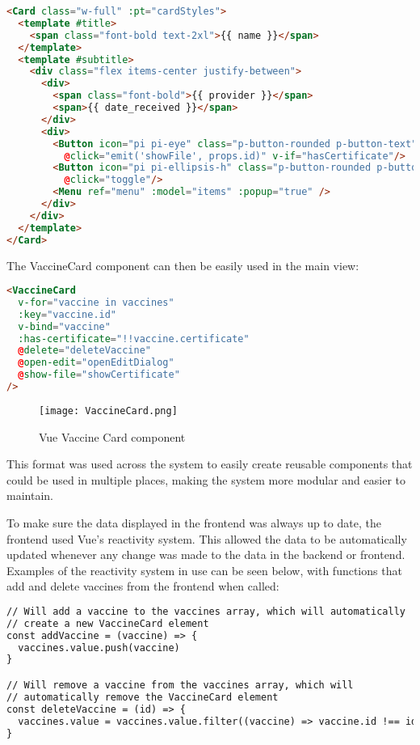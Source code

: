 \begin{lstlisting}[language=HTML, caption=Vue Vaccine Card Component Example]
<Card class="w-full" :pt="cardStyles">
  <template #title>
    <span class="font-bold text-2xl">{{ name }}</span>
  </template>
  <template #subtitle>
    <div class="flex items-center justify-between">
      <div>
        <span class="font-bold">{{ provider }}</span>
        <span>{{ date_received }}</span> 
      </div>
      <div>
        <Button icon="pi pi-eye" class="p-button-rounded p-button-text"
          @click="emit('showFile', props.id)" v-if="hasCertificate"/>
        <Button icon="pi pi-ellipsis-h" class="p-button-rounded p-button-text"
          @click="toggle"/>
        <Menu ref="menu" :model="items" :popup="true" />
      </div>
    </div>
  </template>
</Card>  
\end{lstlisting}

The VaccineCard component can then be easily used in the main view:

\begin{lstlisting}[language=HTML, caption=Using VaccineCard Component]
<VaccineCard
  v-for="vaccine in vaccines"
  :key="vaccine.id" 
  v-bind="vaccine"
  :has-certificate="!!vaccine.certificate"
  @delete="deleteVaccine"
  @open-edit="openEditDialog"
  @show-file="showCertificate"
/>
\end{lstlisting}

\begin{figure}[htbp]
  \centering
  \texttt{[image: VaccineCard.png]}
  \caption{Vue Vaccine Card component}
  \label{fig:vaccinecard}
\end{figure}

\FloatBarrier

This format was used across the system to easily create reusable components that could be used in multiple places, making the system more modular and easier to maintain.

To make sure the data displayed in the frontend was always up to date, the frontend used Vue's reactivity system. This allowed the data to be automatically updated whenever any change was made to the data in the backend or frontend. Examples of the reactivity system in use can be seen below, with functions that add and delete vaccines from the frontend when called:


\begin{lstlisting}[language=HTML, caption=Vue Reactivity System]
// Will add a vaccine to the vaccines array, which will automatically 
// create a new VaccineCard element
const addVaccine = (vaccine) => {
  vaccines.value.push(vaccine)
}

// Will remove a vaccine from the vaccines array, which will 
// automatically remove the VaccineCard element
const deleteVaccine = (id) => {
  vaccines.value = vaccines.value.filter((vaccine) => vaccine.id !== id)
}
\end{lstlisting}


